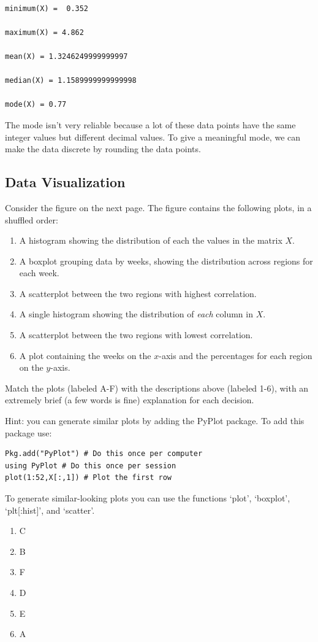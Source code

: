 \documentclass{article}
\def\blu#1{{\color{blu}#1}}
\def\enum#1{\begin{enumerate}#1\end{enumerate}}
\begin{document}
\begin{verbatim}

minimum(X) =  0.352

maximum(X) = 4.862

mean(X) = 1.3246249999999997

median(X) = 1.1589999999999998

mode(X) = 0.77

\end{verbatim}

The mode isn't very reliable because a lot of these data points have the same integer values but different decimal values. To give a meaningful mode, we can make the data discrete by rounding the data points.



\subsection{Data Visualization}

Consider the figure on the next page.
The figure contains the following plots, in a shuffled order:
\enum{
\item A histogram showing the distribution of each the values in the matrix $X$.
\item A boxplot grouping data by weeks, showing the distribution across regions for each week.
\item A scatterplot between the two regions with highest correlation.
\item A single histogram showing the distribution of \emph{each} column in $X$.
\item A scatterplot between the two regions with lowest correlation.
\item A plot containing the weeks on the $x$-axis and the percentages for each region on the $y$-axis.
}
\blu{Match the plots (labeled A-F) with the descriptions above (labeled 1-6), with an extremely brief (a few words is fine) explanation for each decision.}

Hint: you can generate similar plots by adding the PyPlot package. To add this package use:
\begin{verbatim}
Pkg.add("PyPlot") # Do this once per computer
using PyPlot # Do this once per session
plot(1:52,X[:,1]) # Plot the first row
\end{verbatim}
To generate similar-looking plots you can use the functions `plot', `boxplot', `plt[:hist]', and `scatter'.

\begin{enumerate}
\item C
\item B
\item F
\item D
\item E
\item A
\end{enumerate}
\end{document}
